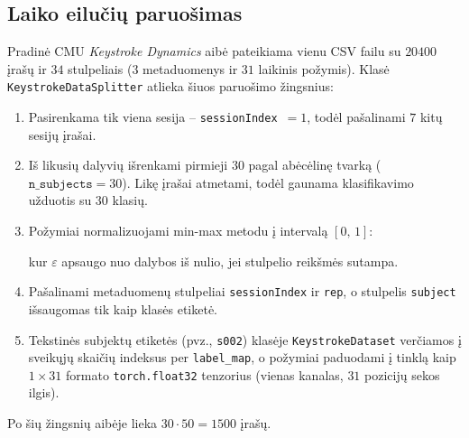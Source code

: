 \subsection{Laiko eilučių paruošimas}
\label{subsec:laiko_eiluciu_paruosimas}

Pradinė CMU \textit{Keystroke Dynamics} aibė pateikiama vienu CSV failu su $20400$ įrašų ir $34$ stulpeliais ($3$ metaduomenys ir $31$ laikinis požymis). Klasė \texttt{KeystrokeDataSplitter} atlieka šiuos paruošimo žingsnius:
\begin{enumerate}
    \item Pasirenkama tik viena sesija – \texttt{sessionIndex}~$=1$, todėl pašalinami $7$ kitų sesijų įrašai.
    \item Iš likusių dalyvių išrenkami pirmieji $30$ pagal abėcėlinę tvarką ($\texttt{n\_subjects}=30$). Likę įrašai atmetami, todėl gaunama klasifikavimo užduotis su $30$ klasių.
    \item Požymiai normalizuojami min-max metodu į intervalą $[0,\,1]$:
    
    kur $\varepsilon$ apsaugo nuo dalybos iš nulio, jei stulpelio reikšmės sutampa.
    \item Pašalinami metaduomenų stulpeliai \texttt{sessionIndex} ir \texttt{rep}, o stulpelis \texttt{subject} išsaugomas tik kaip klasės etiketė.
    \item Tekstinės subjektų etiketės (pvz., \texttt{s002}) klasėje \texttt{KeystrokeDataset} verčiamos į sveikųjų skaičių indeksus per \texttt{label\_map}, o požymiai paduodami į tinklą kaip $1 \times 31$ formato \texttt{torch.float32} tenzorius (vienas kanalas, $31$ pozicijų sekos ilgis).
\end{enumerate}

Po šių žingsnių aibėje lieka $30 \cdot 50 = 1500$ įrašų.
